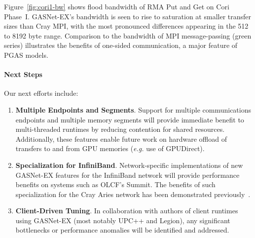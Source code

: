 Figure~\ref{fig:cori1-bw} shows flood bandwidth of RMA Put and Get on Cori
Phase~I.  GASNet-EX's bandwidth is seen to rise to saturation at smaller
transfer sizes than Cray MPI, with the most pronounced differences
appearing in the 512 to 8192 byte range.
%
Comparison to the bandwidth of MPI message-passing (green series) illustrates the
benefits of one-sided communication, a major feature of PGAS models.

\paragraph{Next Steps}

Our next efforts include:
\begin{enumerate}

\item \textbf{Multiple Endpoints and Segments}.  Support for multiple
communications endpoints and multiple memory segments will provide immediate
benefit to multi-threaded runtimes by reducing contention for shared resources.
Additionally, these features enable future work on hardware offload of
transfers to and from GPU memories (\textit{e.g.} use of GPUDirect).

\item \textbf{Specialization for InfiniBand}.  Network-specific implementations
of new GASNet-EX features for the InfiniBand network will provide performance
benefits on systems such as OLCF's Summit.  The benefits of such specialization
for the Cray Aries network has been demonstrated previously~\cite{gasnet-aries}.

\item \textbf{Client-Driven Tuning}.  In collaboration with authors of client
runtimes using GASNet-EX (most notably UPC++ and Legion), any significant
bottlenecks or performance anomalies will be identified and addressed.

\end{enumerate}
